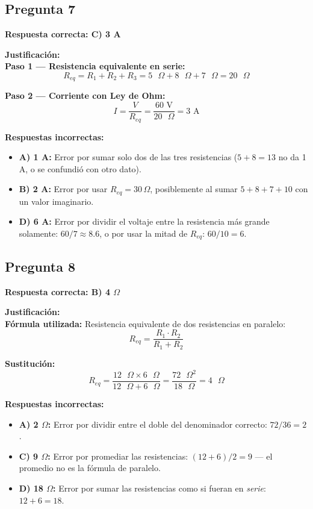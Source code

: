 \begin{respuestabox}
\subsection*{Pregunta 7}
\textcolor{verdecorrecto}{\textbf{Respuesta correcta: C) 3 A}}

\textbf{Justificación:}\\
\textbf{Paso 1 — Resistencia equivalente en serie:}
$$R_{eq} = R_1 + R_2 + R_3 = 5 \text{ }\Omega + 8 \text{ }\Omega + 7 \text{ }\Omega = 20 \text{ }\Omega$$

\textbf{Paso 2 — Corriente con Ley de Ohm:}
$$I = \frac{V}{R_{eq}} = \frac{60 \text{ V}}{20 \text{ }\Omega} = 3 \text{ A}$$

\textbf{Respuestas incorrectas:}
\begin{itemize}
    \item \textbf{A) 1 A:} Error por sumar solo dos de las tres resistencias ($5+8 = 13$ no da 1 A, o se confundió con otro dato).
    \item \textbf{B) 2 A:} Error por usar $R_{eq} = 30\,\Omega$, posiblemente al sumar $5+8+7+10$ con un valor imaginario.
    \item \textbf{D) 6 A:} Error por dividir el voltaje entre la resistencia más grande solamente: $60/7 \approx 8.6$, o por usar la mitad de $R_{eq}$: $60/10 = 6$.
\end{itemize}
\end{respuestabox}

\begin{respuestabox}
\subsection*{Pregunta 8}
\textcolor{verdecorrecto}{\textbf{Respuesta correcta: B) 4 $\Omega$}}

\textbf{Justificación:}\\
\textbf{Fórmula utilizada:} Resistencia equivalente de dos resistencias en paralelo:
$$R_{eq} = \frac{R_1 \cdot R_2}{R_1 + R_2}$$

\textbf{Sustitución:}
$$R_{eq} = \frac{12 \text{ }\Omega \times 6 \text{ }\Omega}{12 \text{ }\Omega + 6 \text{ }\Omega} = \frac{72 \text{ }\Omega^2}{18 \text{ }\Omega} = 4 \text{ }\Omega$$

\textbf{Respuestas incorrectas:}
\begin{itemize}
    \item \textbf{A) 2 $\Omega$:} Error por dividir entre el doble del denominador correcto: $72/36 = 2$.
    \item \textbf{C) 9 $\Omega$:} Error por promediar las resistencias: $(12+6)/2 = 9$ — el promedio no es la fórmula de paralelo.
    \item \textbf{D) 18 $\Omega$:} Error por sumar las resistencias como si fueran en \textit{serie}: $12+6 = 18$.
\end{itemize}
\end{respuestabox}

